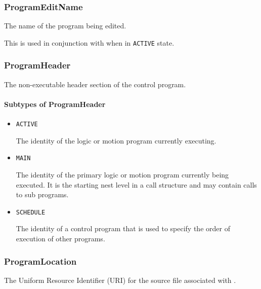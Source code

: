 \subsubsection{ProgramEditName}
\label{sec:ProgramEditName}



The name of the program being edited. 

This is used in conjunction with  when in \texttt{ACTIVE} state. 



\subsubsection{ProgramHeader}
\label{sec:ProgramHeader}



The non-executable header section of the control program.


\paragraph{Subtypes of ProgramHeader}\mbox{}
\label{sec:Subtypes of ProgramHeader}

\begin{itemize}

\item \texttt{ACTIVE}


The identity of the logic or motion program currently executing.

\item \texttt{MAIN}


The identity of the primary logic or motion program currently being executed. It is the starting nest level in a call structure and may contain calls to sub programs.

\item \texttt{SCHEDULE}


The identity of a control program that is used to specify the order of execution of other programs.


\end{itemize}






\subsubsection{ProgramLocation}
\label{sec:ProgramLocation}



The Uniform Resource Identifier (URI) for the source file associated with .


